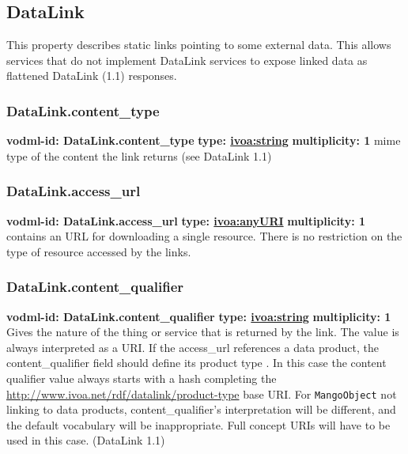   \subsection{DataLink}
    \label{sect:DataLink}
    This property describes static links pointing to some external data. This allows services that do not implement DataLink services to expose linked data as flattened DataLink (1.1) responses.

    \subsubsection{DataLink.content\_type}
    \textbf{vodml-id: DataLink.content\_type} \newline
    \textbf{type: \hyperref[sect:ivoa]{ivoa:string}} \newline
    \textbf{multiplicity: 1} \newline
    mime type of the content the link returns (see DataLink 1.1)

    \subsubsection{DataLink.access\_url}
    \textbf{vodml-id: DataLink.access\_url} \newline
    \textbf{type: \hyperref[sect:ivoa]{ivoa:anyURI}} \newline
    \textbf{multiplicity: 1} \newline
    contains an URL for downloading a single resource. There is no restriction on the type of resource accessed by the links.

    \subsubsection{DataLink.content\_qualifier}
    \textbf{vodml-id: DataLink.content\_qualifier} \newline
    \textbf{type: \hyperref[sect:ivoa]{ivoa:string}} \newline
    \textbf{multiplicity: 1} \newline
    Gives the nature of the thing or service that is returned by the link. The value is always interpreted as a URI. If the access\_url references a data product, the content\_qualifier field should define its product type . In this case the content qualifier value always starts with a hash completing the \url{http://www.ivoa.net/rdf/datalink/product-type} base URI. For \texttt{MangoObject} not linking to data products, content\_qualifier’s interpretation will be different, and the default vocabulary will be inappropriate. Full concept URIs will have to be used in this case. (DataLink 1.1)

